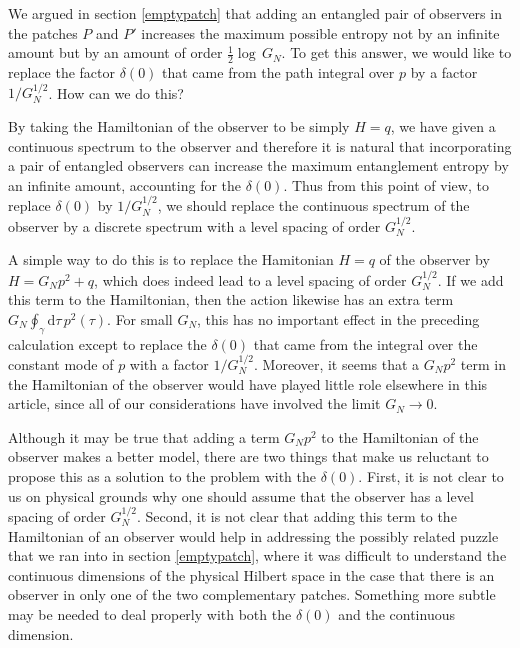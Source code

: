 \documentclass[11pt,a4paper]{article}
\def\d{{\mathrm d}}
\begin{document}
We argued in section \ref{emptypatch} that adding an entangled pair of observers in the patches $P$ and $P'$ increases the maximum possible entropy not
by an infinite amount but by an amount of order $\frac{1}{2}\log\, G_N$.   To get this answer, we would like to replace the factor $\delta(0)$ that came from
the path integral over $p$ by a factor $1/G_N^{1/2}$.     How can we do this?

By taking the Hamiltonian of the observer to be simply $H=q$, we have given a continuous spectrum to the observer and therefore it is natural that incorporating a pair
of entangled observers can increase the maximum entanglement entropy by an infinite amount, accounting for the $\delta(0)$.   Thus from this point of view,
to replace $\delta(0)$ by $1/G_N^{1/2}$, we should replace the continuous spectrum of the observer by a discrete spectrum with a level spacing of order $G_N^{1/2}$.

A simple way to do this is to replace the Hamitonian $H=q$ of the observer by $H=G_N p^2+q$, which does indeed lead to a level spacing of order $G_N^{1/2}$.
If we add this term to the Hamiltonian, then the action likewise has an extra term $G_N\oint_\gamma \d \tau\, p^2(\tau)$.   For small $G_N$, this has no important
effect in the preceding calculation except to replace the $\delta(0)$ that came from the integral over the constant mode of $p$ with a factor $1/G_N^{1/2}$.
Moreover, it seems that a $G_N p^2$ term in the Hamiltonian of the observer would have played little role elsewhere in this article, since all of our considerations
have involved the limit $G_N\to 0$.

Although it may be true that adding a term $G_N p^2$ to the Hamiltonian of the observer makes a better model, there are two things that make us reluctant to propose
this as a solution to the problem with the $\delta(0)$.   First, it is not clear to us on physical grounds why one should assume that the observer has a level spacing
of order $G_N^{1/2}$.   Second, it is not clear that adding this term to the Hamiltonian of an observer would help in addressing the possibly related puzzle
that we ran into in section \ref{emptypatch}, where it was difficult to understand the continuous dimensions of the 
physical Hilbert space in the case that there is an observer in only one of the
two complementary patches.    Something more subtle may be needed to deal properly with both the $\delta(0)$ and the continuous dimension.
\end{document}

